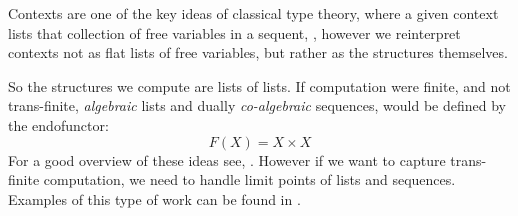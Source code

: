 Contexts are one of the key ideas of classical type theory, where a given
context lists that collection of free variables in a sequent, \cite{
jacobs1999categoricalLogicTypeTheory,
awodeyCoquandVoevodsky2013homotopyTypeTheory}, however we reinterpret contexts
not as flat lists of free variables, but rather as the structures themselves.

So the structures we compute are lists of lists. If computation were finite, and
not trans-finite, \emph{algebraic} lists and dually \emph{co-algebraic}
sequences, would be defined by the endofunctor:
\begin{equation*}
F(X) = X \times X
\end{equation*}
For a good overview of these ideas see, \cite{jacobs2012coalg}. However if we
want to capture trans-finite computation, we need to handle limit points of
lists and sequences. Examples of this type of work can be found in
\cite{aczel1988nonWellFoundedSets, joyalMoerdijk1995algSetTh}.